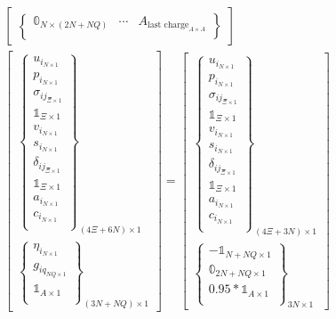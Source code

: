 \documentclass[conference]{IEEEtran}
\begin{document}
\begin{equation}
\begin{array}{c}
\begin{bmatrix}
\begin{Bmatrix}
            \mathbb{0}_{N \times (2N + NQ)}           & \cdots                                     & A_{\textrm{last charge}_{A \times A}} \\
        \end{Bmatrix}
    \end{bmatrix}  \\
    \begin{bmatrix}
        \begin{Bmatrix}
            u_{i_{N \times 1}} \\ p_{i_{N \times 1}} \\ \sigma_{ij_{\Xi \times 1}} \\ \mathbb{1}_{\Xi \times 1} \\ v_{i_{N \times 1}} \\ s_{i_{N \times 1}} \\ \delta_{ij_{\Xi \times 1}} \\ \mathbb{1}_{\Xi \times 1} \\ a_{i_{N \times 1}} \\ c_{i_{N \times 1}} \\
        \end{Bmatrix}_{(4\Xi + 6N) \times 1} \\
        \begin{Bmatrix}
            \eta_{i_{N \times 1}} \\
            g_{iq_{NQ \times 1}} \\
            \mathbb{1}_{A \times 1} \\
        \end{Bmatrix}_{(3N + NQ) \times 1}
    \end{bmatrix}
    =
    \begin{bmatrix}
        \begin{Bmatrix}
            u_{i_{N \times 1}} \\ p_{i_{N \times 1}} \\ \sigma_{ij_{\Xi \times 1}} \\ \mathbb{1}_{\Xi \times 1} \\ v_{i_{N \times 1}} \\ s_{i_{N \times 1}} \\ \delta_{ij_{\Xi \times 1}} \\ \mathbb{1}_{\Xi \times 1} \\ a_{i_{N \times 1}} \\ c_{i_{N \times 1}} \\
        \end{Bmatrix}_{(4\Xi + 3N) \times 1} \\
        \begin{Bmatrix}
            -\mathbb{1}_{N + NQ \times 1} \\
            \mathbb{0}_{2N + NQ \times 1} \\
            0.95*\mathbb{1}_{A \times 1} \\
        \end{Bmatrix}_{3N \times 1}
    \end{bmatrix}
\end{array}
\end{equation}

\end{document}
